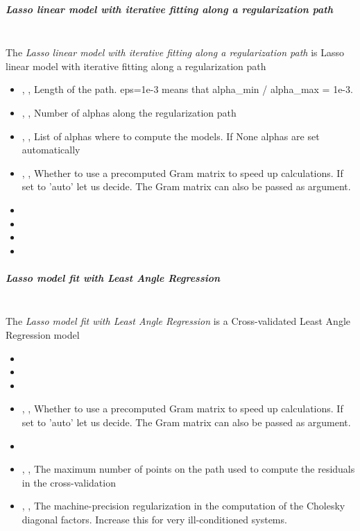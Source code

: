 \subparagraph{Lasso linear model with iterative fitting along a regularization
  path}
\mbox{}
\\The \textit{Lasso linear model with iterative fitting along a regularization
  path} is Lasso linear model with iterative fitting along a regularization path
\begin{itemize}
  \item {} , ,
  Length of the path.
  eps=1e-3 means that alpha\_min / alpha\_max =
  1e-3.
  \item {} , ,
  Number of alphas along the regularization path
  \item {} , ,
  List of alphas where to compute the models.
  If None alphas are set automatically
  \item {} , ,
  Whether to use a precomputed Gram matrix to speed up calculations.
  If set to 'auto' let us decide.
  The Gram matrix can also be passed as argument.
  \item \maxIterDescription{}
  \item {}
  \item \verDescriptionB
  \item \positiveDescription{}
\end{itemize}

\subparagraph{Lasso model fit with Least Angle Regression }
\mbox{}
\\The \textit{Lasso model fit with Least Angle Regression} is a Cross-validated
Least Angle Regression model
\begin{itemize}
  \item {}
  \item \verDescriptionB
  \item {}
  \item {} , ,
  Whether to use a precomputed Gram matrix to speed up calculations.
  If set to 'auto' let us decide.
  The Gram matrix can also be passed as argument.
  \item \maxIterDescription{}
  \item {}, ,
  The maximum number of points on the path used to compute the residuals in the
  cross-validation
  \item {} , ,
  The machine-precision regularization in the computation of the Cholesky
  diagonal factors.
  Increase this for very ill-conditioned systems.
\end{itemize}

